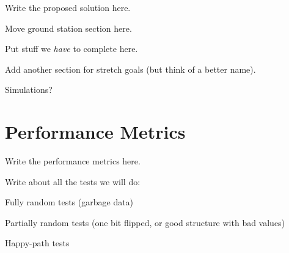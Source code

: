 \documentclass[10pt,journal,draftclsnofoot,onecolumn]{IEEEtran}
\begin{document}
Write the proposed solution here.

Move ground station section here.

Put stuff we \textit{have} to complete here.

Add another section for stretch goals (but think of a better name).

Simulations?


\section{Performance Metrics}
Write the performance metrics here.

Write about all the tests we will do:

Fully random tests (garbage data)

Partially random tests (one bit flipped, or good structure with bad values)

Happy-path tests
\end{document}
